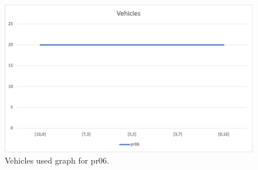 \begin{figure}[H]
    \centering
    \includegraphics[width=1.0\columnwidth]{../graphs/pr06-vehicles.png}
    \caption{Vehicles used graph for pr06.}
\end{figure}

